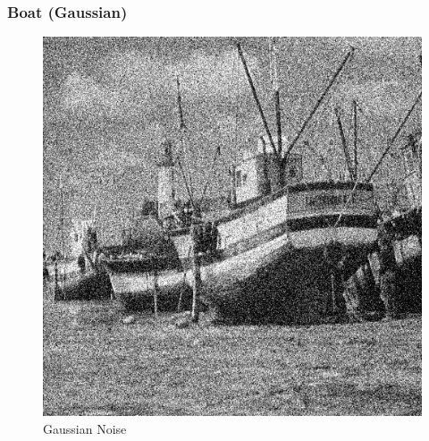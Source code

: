 \documentclass{article}
\begin{document}
    \subsubsection*{Boat (Gaussian)}
    
    \begin{figure}[!htb]
    \begin{center}
     \includegraphics[scale=.3]{./basic_denoising/boat/gaussian.png}
     \caption{Gaussian Noise}
    \end{center}
    \end{figure}
    
\end{document}
